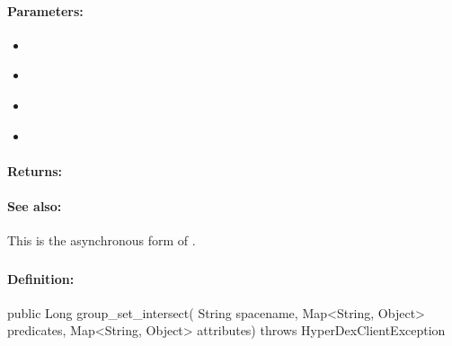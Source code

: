 \paragraph{Parameters:}
\begin{itemize}[noitemsep]
\item {}\\

\item {}\\

\item {}\\

\item {}\\

\end{itemize}

\paragraph{Returns:}


\paragraph{See also:}  This is the asynchronous form of .

\pagebreak
\subsubsection{}
\label{api:java:group_set_intersect}


\paragraph{Definition:}
\begin{javacode}
public Long group_set_intersect(
        String spacename,
        Map<String, Object> predicates,
        Map<String, Object> attributes) throws HyperDexClientException
\end{javacode}

